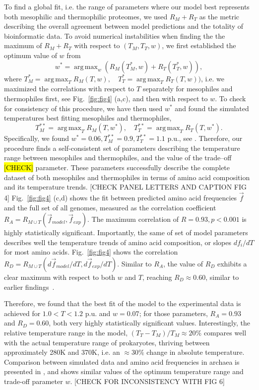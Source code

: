 \documentclass[10pt,letterpaper]{article}
\DeclareMathOperator*{\argmax}{arg\,max}
\begin{document}
To find a global fit, i.e. the range of parameters where our model best represents both mesophilic and thermophilic proteomes, we used $R_M + R_T$ as the metric describing the overall agreement between model predictions and the totality of bioinformatic data. To avoid numerical instabilities when finding the the maximum of $R_M+R_T$ with respect to $(T_M, T_T, w)$, we first established the optimum value of $w$ from
$$
w^* = \argmax_{w} (R_M(T_M^*, w) + R_T(T^*_T,w) ),
$$
where $T_M^*=\argmax_{T}R_M(T,w), \quad T_T^*=\argmax_{T}R_T(T,w))$, i.e. we maximized the correlations with respect to $T$ separately for mesophiles and thermophiles first, see Fig.~\ref{fig:fig4} (a,c), and then with respect to $w$. To check for consistency of this procedure, we have then used $w^*$ and found the simulated temperatures best fitting mesophiles and thermophiles, 
$$
T^{**}_M = \argmax_{T}R_M(T, w^*), \quad T^{**}_T = \argmax_{T}R_T(T, w^*).
$$
Specifically, we found $w^*=0.06,  T^{**}_M=0.9, T^{**}_T=1.1$ p.u., see . Therefore, our procedure finds a self-consistent set of parameters describing the temperature range between mesophiles and thermophiles, and the value of the trade--off \hl{[CHECK]} parameter. These parameters successfully describe the complete dataset of both mesophiles and thermophiles in terms of amino acid composition and its temperature trends. [CHECK PANEL LETTERS AND CAPTION FIG 4] Fig.~\ref{fig:fig4} (c,d) shows the fit between predicted amino acid frequencies $\vec f$ and the full set of all genomes, measured as the correlation coefficient $R_A = R_{M \cup T}(\vec f_{model}, \vec f_{exp})$. The maximum correlation of $R=0.93, p<0.001$ is highly statistically significant. Importantly, the same of set of model parameters describes well the temperature trends of amino acid composition, or slopes $df_i/dT$ for most amino acids. Fig.~\ref{fig:fig4} shows the correlation $R_D = R_{M\cup T}(d\vec f_{model}{/dT}, d\vec f_{exp}/dT)$. Similar to $R_A$, the value of $R_D$ exhibits a clear maximum with respect to both $w$ and $T$, reaching $R_D\approx0.60$, similar to earlier findings~\cite{Venev2015Massively}.

Therefore, we found that the best fit of the model to the experimental data is achieved for $1.0<T<1.2$ p.u. and $w=0.07$; for those parameters, $R_A=0.93$ and $R_D=0.60$, both very highly statistically significant values. Interestingly, the relative temperature range in the model, $(T_T-T_M)/T_M\approx 20\%$ compares well with the actual temperature range of prokaryotes, thriving between approximately 280K and 370K, i.e. an $\approx 30\%$ change in absolute temperature. Comparison between simulated data and amino acid frequencies in archaea is presented in , and shows similar values of the optimum temperature range and trade-off parameter $w$. [CHECK FOR INCONSISTENCY WITH FIG 6]
\end{document}
